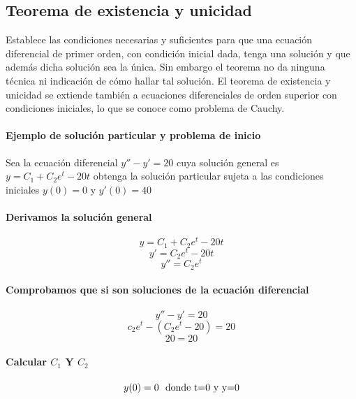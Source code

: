 \documentclass{article}
\begin{document}
\subsection{Teorema de existencia y unicidad}
Establece las condiciones necesarias y suficientes para que una ecuación diferencial de primer orden, con condición inicial dada, tenga una solución y que además dicha solución sea la única.
Sin embargo el teorema no da ninguna técnica ni indicación de cómo hallar tal solución. El teorema de existencia y unicidad se extiende también a ecuaciones diferenciales de orden superior con condiciones iniciales, lo que se conoce como problema de Cauchy.
\paragraph{Ejemplo de solución particular y  problema de inicio}\cite{Dan}
 Sea la ecuación diferencial \emph{$y'' - y'=20$} cuya solución general es \emph{$y=C_1 + C_2e^{t} - 20t$} obtenga la solución particular sujeta a las condiciones iniciales $y(0)=0$  y $y'(0)=40$ 
 \paragraph{Derivamos la solución general}
\begin{equation}
y=C_1 + C_2e^{t} - 20t 
\end{equation}
\begin{equation}
y'=C_2e^{t} - 20t
\end{equation}
\begin{equation}
y''=C_2e^{t}
\end{equation}
\paragraph{Comprobamos que si son soluciones de la ecuación diferencial}
\begin{equation}
y'' - y'=20 
\end{equation}
\begin{equation}
c_2e^{t} - (C_2e^{t} - 20)=20 
\end{equation}
\begin{equation}
20=20 
\end{equation}
\paragraph{Calcular $C_1$ Y $C_2$}
\begin{equation}
y(0)=0 \ \ \textup{donde t=0 y y=0}
\end{equation}
\end{document}
